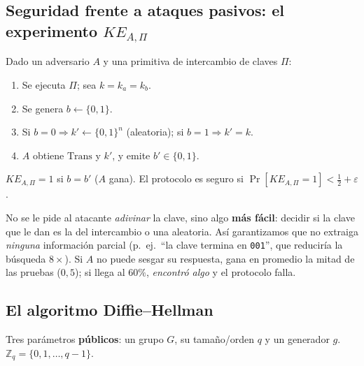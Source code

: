 \documentclass[11pt,a4paper]{article}
\newcommand{\Zn}{\mathbb{Z}}
\begin{document}
\subsection{Seguridad frente a ataques pasivos: el experimento $KE_{A,\Pi}$}
\begin{slidebox}
Dado un adversario $A$ y una primitiva de intercambio de claves $\Pi$:
\begin{enumerate}[leftmargin=1.8em,itemsep=1pt]
  \item Se ejecuta $\Pi$; sea $k=k_a=k_b$.
  \item Se genera $b \leftarrow \{0,1\}$.
  \item Si $b=0 \Rightarrow k' \leftarrow \{0,1\}^n$ (aleatoria); si $b=1 \Rightarrow k'=k$.
  \item $A$ obtiene $\text{Trans}$ y $k'$, y emite $b'\in\{0,1\}$.
\end{enumerate}
$KE_{A,\Pi}=1$ si $b=b'$ ($A$ gana). El protocolo es seguro si
$\Pr[KE_{A,\Pi}=1] < \tfrac12 + \varepsilon$.
\end{slidebox}

\noindent No se le pide al atacante \emph{adivinar} la clave, sino algo \textbf{más fácil}:
decidir si la clave que le dan es la del intercambio o una aleatoria. Así garantizamos que no
extraiga \emph{ninguna} información parcial (p.\ ej.\ ``la clave termina en \texttt{001}'',
que reduciría la búsqueda $8\times$). Si $A$ no puede sesgar su respuesta, gana en promedio la
mitad de las pruebas ($0{,}5$); si llega al $60\%$, \emph{encontró algo} y el protocolo falla.

\subsection{El algoritmo Diffie--Hellman}
Tres parámetros \textbf{públicos}: un grupo $G$, su tamaño/orden $q$ y un generador $g$.
$\Zn_q=\{0,1,\dots,q-1\}$.
\end{document}
